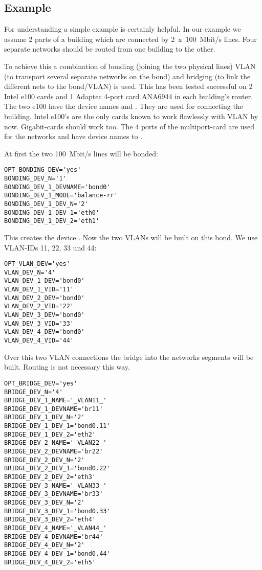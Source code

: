 \subsection{Example}

For understanding a simple example is certainly helpful. In our example 
we assume 2 parts of a building which are connected by 2~x~100~Mbit/s lines.
Four separate networks should be routed from one building to the other.

To achieve this a combination of bonding (joining the two physical lines) 
VLAN (to transport several separate networks on the bond) and bridging 
(to link the different nets to the bond/VLAN) is used. This has been tested 
successful on 2 Intel e100 cards and 1 Adaptec 4-port card ANA6944 in each 
building's router.
The two e100 have the device names  and . They 
are used for connecting the building. Intel e100's are the only cards known 
to work flawlessly with VLAN by now. Gigabit-cards should work too.
The 4 ports of the multiport-card are used for the networks and have device
names  to .

At first the two 100~Mbit/s lines will be bonded:

\begin{example}
\begin{verbatim}
OPT_BONDING_DEV='yes'
BONDING_DEV_N='1'
BONDING_DEV_1_DEVNAME='bond0'
BONDING_DEV_1_MODE='balance-rr'
BONDING_DEV_1_DEV_N='2'
BONDING_DEV_1_DEV_1='eth0'
BONDING_DEV_1_DEV_2='eth1'
\end{verbatim}
\end{example}

This creates the device . Now the two VLANs will 
be built on this bond. We use VLAN-IDs 11, 22, 33 und 44:

\begin{example}
\begin{verbatim}
OPT_VLAN_DEV='yes'
VLAN_DEV_N='4'
VLAN_DEV_1_DEV='bond0'
VLAN_DEV_1_VID='11'
VLAN_DEV_2_DEV='bond0'
VLAN_DEV_2_VID='22'
VLAN_DEV_3_DEV='bond0'
VLAN_DEV_3_VID='33'
VLAN_DEV_4_DEV='bond0'
VLAN_DEV_4_VID='44'
\end{verbatim}
\end{example}

Over this two VLAN connections the bridge into the networks segments will be 
built. Routing is not necessary this way.

\begin{example}
\begin{verbatim}
OPT_BRIDGE_DEV='yes'
BRIDGE_DEV_N='4'
BRIDGE_DEV_1_NAME='_VLAN11_'
BRIDGE_DEV_1_DEVNAME='br11'
BRIDGE_DEV_1_DEV_N='2'
BRIDGE_DEV_1_DEV_1='bond0.11'
BRIDGE_DEV_1_DEV_2='eth2'
BRIDGE_DEV_2_NAME='_VLAN22_'
BRIDGE_DEV_2_DEVNAME='br22'
BRIDGE_DEV_2_DEV_N='2'
BRIDGE_DEV_2_DEV_1='bond0.22'
BRIDGE_DEV_2_DEV_2='eth3'
BRIDGE_DEV_3_NAME='_VLAN33_'
BRIDGE_DEV_3_DEVNAME='br33'
BRIDGE_DEV_3_DEV_N='2'
BRIDGE_DEV_3_DEV_1='bond0.33'
BRIDGE_DEV_3_DEV_2='eth4'
BRIDGE_DEV_4_NAME='_VLAN44_'
BRIDGE_DEV_4_DEVNAME='br44'
BRIDGE_DEV_4_DEV_N='2'
BRIDGE_DEV_4_DEV_1='bond0.44'
BRIDGE_DEV_4_DEV_2='eth5'
\end{verbatim}
\end{example}

